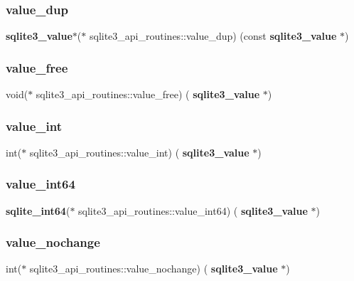\subsubsection{value\_dup}
{\footnotesize\ttfamily \textbf{ sqlite3\+\_\+value}$\ast$($\ast$ sqlite3\+\_\+api\+\_\+routines\+::value\+\_\+dup) (const \textbf{ sqlite3\+\_\+value} $\ast$)}

\mbox{\label{structsqlite3__api__routines_a8ef401c465629f4f61f574cc98e01955}} 
\subsubsection{value\_free}
{\footnotesize\ttfamily void($\ast$ sqlite3\+\_\+api\+\_\+routines\+::value\+\_\+free) (\textbf{ sqlite3\+\_\+value} $\ast$)}

\mbox{\label{structsqlite3__api__routines_aaea71f352f2637f7d43781cd279ece62}} 
\subsubsection{value\_int}
{\footnotesize\ttfamily int($\ast$ sqlite3\+\_\+api\+\_\+routines\+::value\+\_\+int) (\textbf{ sqlite3\+\_\+value} $\ast$)}

\mbox{\label{structsqlite3__api__routines_a27cfd29e44574a9b10f0a7cb3a7c9ada}} 
\subsubsection{value\_int64}
{\footnotesize\ttfamily \textbf{ sqlite\+\_\+int64}($\ast$ sqlite3\+\_\+api\+\_\+routines\+::value\+\_\+int64) (\textbf{ sqlite3\+\_\+value} $\ast$)}

\mbox{\label{structsqlite3__api__routines_a291611a46db5991857ec5e0893194818}} 
\subsubsection{value\_nochange}
{\footnotesize\ttfamily int($\ast$ sqlite3\+\_\+api\+\_\+routines\+::value\+\_\+nochange) (\textbf{ sqlite3\+\_\+value} $\ast$)}

